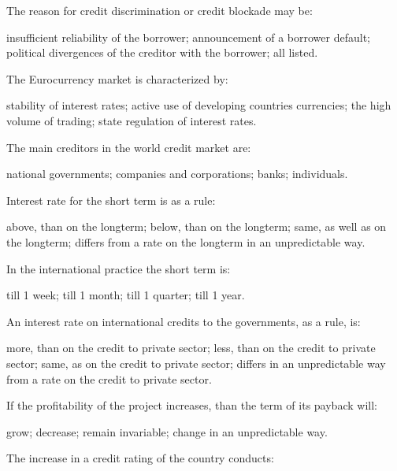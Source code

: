 \documentclass[12pt, table]{exam}
\begin{document}
\begin{questions}
\begin{multicols}{2}
\setlength{\columnsep}{1cm}

\question The reason for credit discrimination or credit blockade may be:
	 \begin{choices}
	 \CC insufficient reliability of the borrower;
	 \choice announcement of a borrower default;
	 \choice political divergences of the creditor with the borrower;
	 \choice all listed.
	 \end{choices}
\question The Eurocurrency market is characterized by:
	 \begin{choices}
	 \choice stability of interest rates;
	 \CC active use of developing countries currencies;
	 \choice the high volume of trading;
	 \choice state regulation of interest rates.
	 \end{choices}
\question The main creditors in the world credit market are:
	 \begin{choices}
	 \choice national governments;
	 \CC companies and corporations;
	 \choice banks;
	 \choice individuals.
	 \end{choices}
\question Interest rate for the short term is as a rule:
	 \begin{choices}
	 \CC above, than on the longterm;
	 \choice below, than on the longterm;
	 \choice same, as well as on the longterm;
	 \choice differs from a rate on the longterm in an unpredictable way.
	 \end{choices}
\question In the international practice the short term is:
	 \begin{choices}
	 \choice till 1 week;
	 \CC till 1 month;
	 \choice till 1 quarter;
	 \choice till 1 year.
	 \end{choices}
\question An interest rate on international credits to the governments, as a rule, is:
	 \begin{choices}
	 \choice more, than on the credit to private sector;
	 \CC less, than on the credit to private sector;
	 \choice same, as on the credit to private sector;
	 \choice differs in an unpredictable way from a rate on the credit to private sector.
	 \end{choices}
\question If the profitability of the project increases, than the term of its payback will:
	 \begin{choices}
	 \CC grow;
	 \choice decrease;
	 \choice remain invariable;
	 \choice change in an unpredictable way.
	 \end{choices}
\question The increase in a credit rating of the country conducts:

\end{multicols}
\end{questions}
\end{document}
